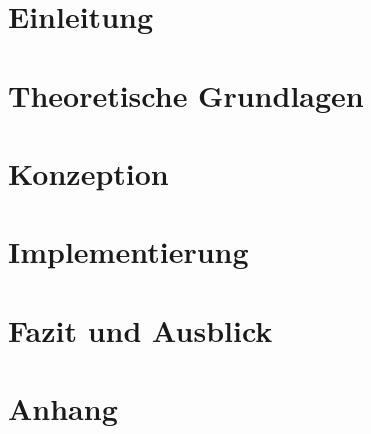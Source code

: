 \documentclass[
  a4paper,
  12pt,
  oneside,
  headings=normal,
  listof=totoc,
  bibliography=totoc,
  captions=tableheading,
  numbers=noenddot,
  parskip=half
]{scrreprt}
\begin{document}


\cleardoublepage
{}



\cleardoublepage
{}
\tableofcontents

\cleardoublepage
\listoffigures

\cleardoublepage
\listoftables

\cleardoublepage
\lstlistoflistings

\cleardoublepage


\cleardoublepage
{}

\chapter{Einleitung}
\label{chap:introduction}


\chapter{Theoretische Grundlagen}
\label{chap:background}


\chapter{Konzeption}
\label{chap:concept}


\chapter{Implementierung}
\label{chap:implementation}


\chapter{Fazit und Ausblick}
\label{chap:conclusion}


\appendix
\chapter{Anhang}
\label{chap:appendix}


\cleardoublepage
\printbibliography
\end{document}
